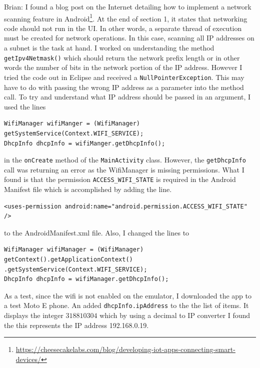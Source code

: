\documentclass[fontsize=11pt, %
                             paper=a4, %
                             twoside, %
                             captions=tableheading,
                             index=totoc,
                             hyperref]{labbook}
\begin{document}
\begin{addmargin}[0cm]{0cm}
Brian:
I found a blog post on the Internet detailing how to implement a network scanning feature in Android\footnote{\url{https://cheesecakelabs.com/blog/developing-iot-apps-connecting-smart-devices/}}. At the end of section 1, it states that networking code should not run in the UI. In other words, a separate thread of execution must be created for network operations. In this case, scanning all IP addresses on a subnet is the task at hand. I worked on understanding the method \texttt{getIpv4Netmask()} which should return the network prefix length or in other words the number of bits in the network portion of the IP address. However I tried the code out in Eclipse and received a \texttt{NullPointerException}. This may have to do with passing the wrong IP address as a parameter into the method call. To try and understand what IP address should be passed in an argument, I used the lines
\begin{Verbatim}
WifiManager wifiManger = (WifiManager) getSystemService(Context.WIFI_SERVICE);
DhcpInfo dhcpInfo = wifiManger.getDhcpInfo();
\end{Verbatim}
in the \texttt{onCreate} method of the \texttt{MainActivity} class. However, the  \texttt{getDhcpInfo} call was returning an error as the WifiManager is missing permissions. What I found is that the permission \texttt{ACCESS\_WIFI\_STATE} is required in the Android Manifest file which is accomplished by adding the line.
\begin{Verbatim}
<uses-permission android:name="android.permission.ACCESS_WIFI_STATE" />
\end{Verbatim}
to the AndroidManifest.xml file. Also, I changed the lines to 
\begin{Verbatim}
WifiManager wifiManager = (WifiManager) getContext().getApplicationContext()
.getSystemService(Context.WIFI_SERVICE);
DhcpInfo dhcpInfo = wifiManager.getDhcpInfo();
\end{Verbatim}
As a test, since the wifi is not enabled on the emulator, I downloaded the app to a test Moto E phone. An added \texttt{dhcpInfo.ipAddress} to the the list of items. It displays the integer $318810304$ which by using a decimal to IP converter I found the this represents the IP address 192.168.0.19.


\end{addmargin}
\end{document}
